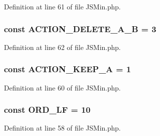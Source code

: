 Definition at line 61 of file J\+S\+Min.\+php.

\subsubsection[{\texorpdfstring{A\+C\+T\+I\+O\+N\+\_\+\+D\+E\+L\+E\+T\+E\+\_\+\+A\+\_\+B}{ACTION_DELETE_A_B}}]{\setlength{\rightskip}{0pt plus 5cm}const A\+C\+T\+I\+O\+N\+\_\+\+D\+E\+L\+E\+T\+E\+\_\+\+A\+\_\+B = 3}\hypertarget{class_j_s_min_a95439dfa2ad58ee0dc891dfe5f26cbc0}{}\label{class_j_s_min_a95439dfa2ad58ee0dc891dfe5f26cbc0}


Definition at line 62 of file J\+S\+Min.\+php.

\subsubsection[{\texorpdfstring{A\+C\+T\+I\+O\+N\+\_\+\+K\+E\+E\+P\+\_\+A}{ACTION_KEEP_A}}]{\setlength{\rightskip}{0pt plus 5cm}const A\+C\+T\+I\+O\+N\+\_\+\+K\+E\+E\+P\+\_\+A = 1}\hypertarget{class_j_s_min_afba9736b01286c04ae584370282baa29}{}\label{class_j_s_min_afba9736b01286c04ae584370282baa29}


Definition at line 60 of file J\+S\+Min.\+php.

\subsubsection[{\texorpdfstring{O\+R\+D\+\_\+\+LF}{ORD_LF}}]{\setlength{\rightskip}{0pt plus 5cm}const O\+R\+D\+\_\+\+LF = 10}\hypertarget{class_j_s_min_a98f6ca84ead290a98d78d5af97f3b0b3}{}\label{class_j_s_min_a98f6ca84ead290a98d78d5af97f3b0b3}


Definition at line 58 of file J\+S\+Min.\+php.

